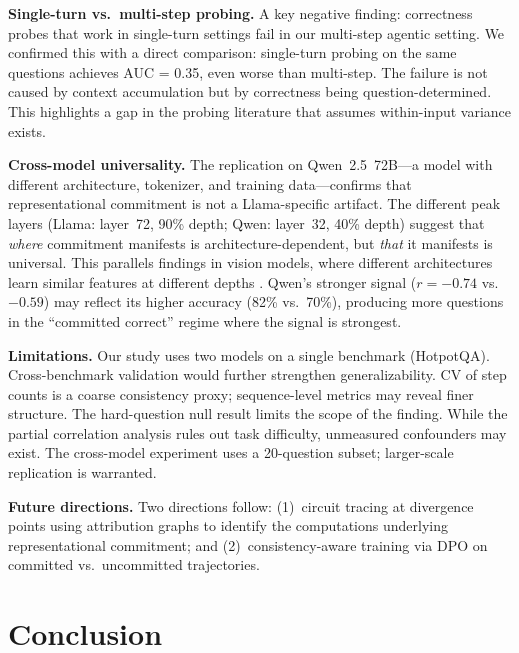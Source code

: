 \documentclass{article}
\begin{document}
\textbf{Single-turn vs.\ multi-step probing.} A key negative finding: correctness probes that work in single-turn settings \citep{gnosis, stickland2024reasoning} fail in our multi-step agentic setting. We confirmed this with a direct comparison: single-turn probing on the same questions achieves AUC = 0.35, even worse than multi-step. The failure is not caused by context accumulation but by correctness being question-determined. This highlights a gap in the probing literature that assumes within-input variance exists.

\textbf{Cross-model universality.} The replication on Qwen~2.5~72B---a model with different architecture, tokenizer, and training data---confirms that representational commitment is not a Llama-specific artifact. The different peak layers (Llama: layer~72, 90\% depth; Qwen: layer~32, 40\% depth) suggest that \emph{where} commitment manifests is architecture-dependent, but \emph{that} it manifests is universal. This parallels findings in vision models, where different architectures learn similar features at different depths \citep{raghu2021vision}. Qwen's stronger signal ($r = -0.74$ vs.\ $-0.59$) may reflect its higher accuracy (82\% vs.\ 70\%), producing more questions in the ``committed correct'' regime where the signal is strongest.

\textbf{Limitations.} Our study uses two models on a single benchmark (HotpotQA). Cross-benchmark validation would further strengthen generalizability. CV of step counts is a coarse consistency proxy; sequence-level metrics may reveal finer structure. The hard-question null result limits the scope of the finding. While the partial correlation analysis rules out task difficulty, unmeasured confounders may exist. The cross-model experiment uses a 20-question subset; larger-scale replication is warranted.

\textbf{Future directions.} Two directions follow: (1)~circuit tracing at divergence points using attribution graphs \citep{anthropic_circuits} to identify the computations underlying representational commitment; and (2)~consistency-aware training via DPO on committed vs.\ uncommitted trajectories.

\section{Conclusion}
\end{document}
